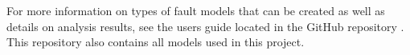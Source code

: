 
For more information on types of fault models that can be created as well as details on analysis results, see the users guide located in the GitHub repository \cite{SAGithub}. This repository also contains all models used in this project.

